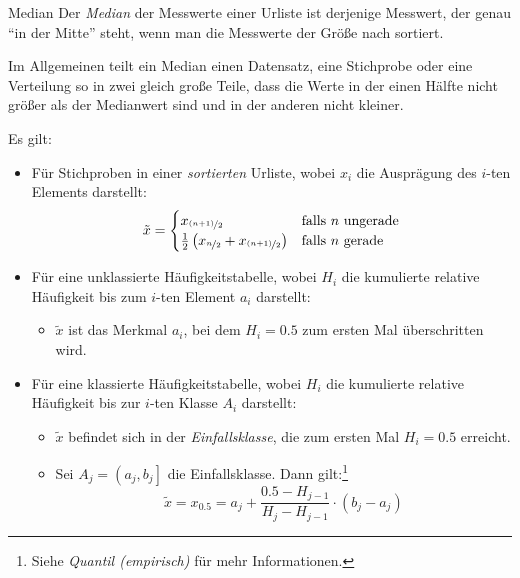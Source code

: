\begin{defi}{Median}
    Der \emph{Median} der Messwerte einer Urliste ist derjenige Messwert, der genau \enquote{in der Mitte} steht, wenn man die Messwerte der Größe nach sortiert.

    Im Allgemeinen teilt ein Median einen Datensatz, eine Stichprobe oder eine Verteilung so in zwei gleich große Teile, dass die Werte in der einen Hälfte nicht größer als der Medianwert sind und in der anderen nicht kleiner.

    Es gilt:
    \begin{itemize}
        \item Für Stichproben in einer \emph{sortierten} Urliste, wobei $x_i$ die Ausprägung des $i$-ten Elements darstellt:
              \[
                  \tilde{x} =
                  \begin{cases}
                      x_{\nicefrac{(n+1)}{2}}                                                  & \text{falls $n$ ungerade} \\
                      \frac{1}{2} \left( x_{\nicefrac{n}{2}} + x_{\nicefrac{(n+1)}{2}} \right) & \text{falls $n$ gerade}
                  \end{cases}
              \]
        \item Für eine unklassierte Häufigkeitstabelle, wobei $H_i$ die kumulierte relative Häufigkeit bis zum $i$-ten Element $a_i$ darstellt:
              \begin{itemize}
                  \item $\tilde{x}$ ist das Merkmal $a_i$, bei dem $H_i = 0.5$ zum ersten Mal überschritten wird.
              \end{itemize}
        \item Für eine klassierte Häufigkeitstabelle, wobei $H_i$ die kumulierte relative Häufigkeit bis zur $i$-ten Klasse $A_i$ darstellt:
              \begin{itemize}
                  \item $\tilde{x}$ befindet sich in der \emph{Einfallsklasse}, die zum ersten Mal $H_i = 0.5$ erreicht.
                  \item Sei $A_j = \left( a_j, b_j \right]$ die Einfallsklasse.
                        Dann gilt:\footnote{Siehe \emph{Quantil (empirisch)} für mehr Informationen.}
                        \[
                            \tilde{x} = x_{0.5} = a_j + \frac{0.5 - H_{j-1}}{H_{j} - H_{j-1}} \cdot (b_j - a_j)
                        \]
              \end{itemize}
    \end{itemize}
\end{defi}

